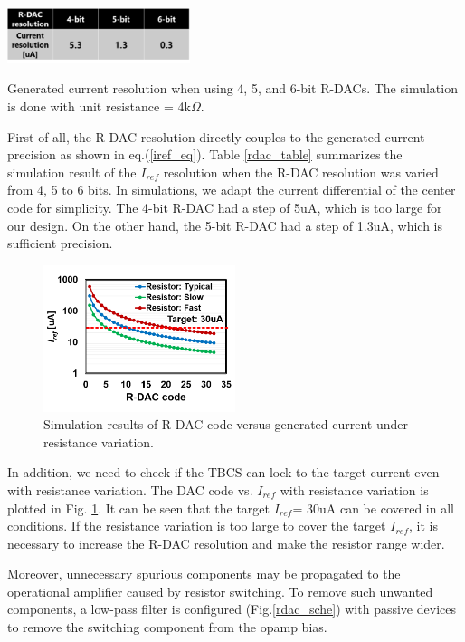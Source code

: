 \documentclass[paper]{ieice}
\begin{document}
\begin{table}[]
\centering
 \includegraphics[width=0.4\textwidth]{figs/rdac_table.png}
  \caption{Generated current resolution when using 4, 5, and 6-bit R-DACs. The simulation is done with unit resistance = 4k$\Omega$.}
\label{rdac_table}
\end{table}

First of all, the R-DAC resolution directly couples to the generated current precision as shown in eq.(\ref{iref_eq}). Table \ref{rdac_table} summarizes the simulation result of the $I_{ref}$ resolution when the R-DAC resolution was varied from 4, 5 to 6 bits. In simulations, we adapt the current differential of the center code for simplicity. The 4-bit R-DAC had a step of 5uA, which is too large for our design. On the other hand, the 5-bit R-DAC had a step of 1.3uA, which is sufficient precision.

\begin{figure}[!]
\centering
 \includegraphics[width=0.5\textwidth]{figs/rdaccode.png}
  \caption{Simulation results of R-DAC code versus generated current under resistance variation.}
\label{rdac_pvt}
\end{figure}

In addition, we need to check if the TBCS can lock to the target current even with resistance variation. The DAC code vs. $I_{ref}$ with resistance variation is plotted in Fig. \ref{rdac_pvt}. It can be seen that the target $I_{ref}$= 30uA can be covered in all conditions. If the resistance variation is too large to cover the target $I_{ref}$, it is necessary to increase the R-DAC resolution and make the resistor range wider.

Moreover, unnecessary spurious components may be propagated to the operational amplifier caused by resistor switching. To remove such unwanted components, a low-pass filter is configured (Fig.\ref{rdac_sche}) with passive devices to remove the switching component from the opamp bias.
\end{document}
